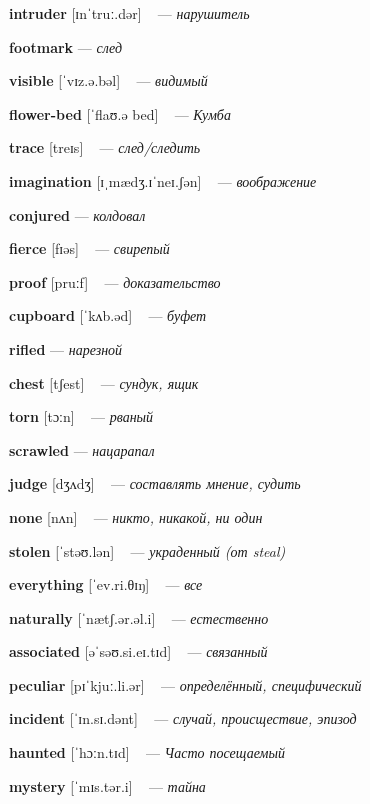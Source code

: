 \documentclass[a4paper,oneside,12pt]{amsart}
\begin{document}
{\large 

 {\bf intruder } [ɪnˈtruː.dər] ~ --- \emph{ нарушитель }

{\bf footmark } --- \emph{ след }

{\bf visible } [ˈvɪz.ə.bəl] ~ --- \emph{ видимый }

{\bf flower-bed } [ˈflaʊ.ə bed] ~ --- \emph{ Кумба }

{\bf trace } [treɪs] ~ --- \emph{ след/следить }

{\bf imagination } [ɪˌmædʒ.ɪˈneɪ.ʃən] ~ --- \emph{ воображение }

{\bf conjured } --- \emph{ колдовал }

{\bf fierce } [fɪəs] ~ --- \emph{ свирепый }

{\bf proof } [pruːf] ~ --- \emph{ доказательство }

{\bf cupboard } [ˈkʌb.əd] ~ --- \emph{ буфет }

{\bf rifled } --- \emph{ нарезной }

{\bf chest } [tʃest] ~ --- \emph{ сундук, ящик }

{\bf torn } [tɔːn] ~ --- \emph{ рваный }

{\bf scrawled } --- \emph{ нацарапал }

{\bf judge } [dʒʌdʒ] ~ --- \emph{ составлять мнение, судить }

{\bf none } [nʌn] ~ --- \emph{ никто, никакой, ни один }

{\bf stolen } [ˈstəʊ.lən] ~ --- \emph{ украденный (от steal) }

{\bf everything } [ˈev.ri.θɪŋ] ~ --- \emph{ все }

{\bf naturally } [ˈnætʃ.ər.əl.i] ~ --- \emph{ естественно }

{\bf associated } [əˈsəʊ.si.eɪ.tɪd] ~ --- \emph{ связанный }

{\bf peculiar } [pɪˈkjuː.li.ər] ~ --- \emph{ определённый, специфический }

{\bf incident } [ˈɪn.sɪ.dənt] ~ --- \emph{ случай, происществие, эпизод }

{\bf haunted } [ˈhɔːn.tɪd] ~ --- \emph{ Часто посещаемый }

{\bf mystery } [ˈmɪs.tər.i] ~ --- \emph{ тайна }

} \vspace{6mm} {\Large 

}
\end{document}
